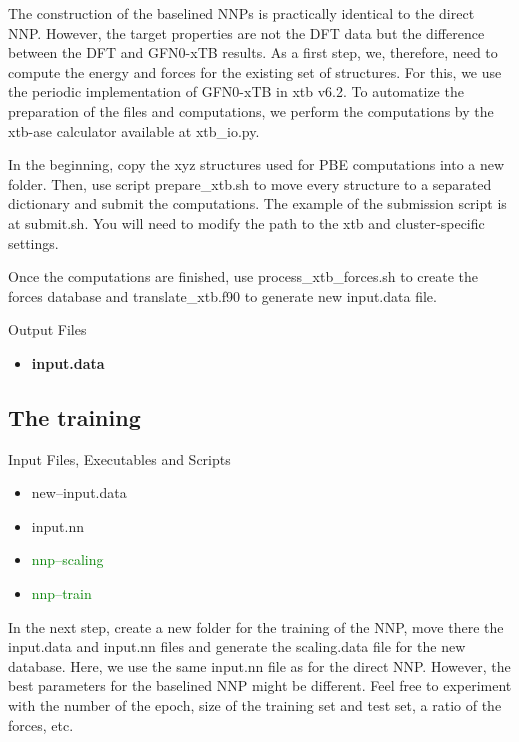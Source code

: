 \documentclass[12pt]{article}
\begin{document}
The construction of the baselined NNPs is practically identical to the direct NNP. However, the target properties are not the DFT data but the difference between the DFT and GFN0-xTB results. As a first step, we, therefore, need to compute the energy and forces for the existing set of structures. For this, we use the periodic implementation of GFN0-xTB in xtb v6.2. To automatize the preparation of the files and computations, we perform the computations by the xtb-ase calculator available at xtb\_io.py. 

In the beginning, copy the xyz structures used for PBE computations into a new folder. Then, use script prepare\_xtb.sh to move every structure to a separated dictionary and submit the computations. The example of the submission script is at submit.sh. You will need to modify the path to the xtb and cluster-specific settings.

Once the computations are finished, use process\_xtb\_forces.sh to create the forces database and translate\_xtb.f90 to generate new input.data file.

\begin{mybox3}{Output Files}
\begin{itemize}
    \item \textbf{input.data}
\end{itemize}
\end{mybox3}
%
\subsection{The training}
\begin{mybox2}{{Input Files, Executables and Scripts}}
\begin{minipage}[c]{0.5\linewidth}
\end{minipage}
\begin{minipage}[c]{0.5\linewidth}
\begin{itemize}
    \item new--input.data
    \item input.nn
    \item \textcolor{green}{nnp--scaling}
    \item \textcolor{green}{nnp--train}
\end{itemize}
\end{minipage}
\end{mybox2}

In the next step, create a new folder for the training of the NNP, move there the input.data and input.nn files and generate the scaling.data file for the new database. Here, we use the same input.nn file as for the direct NNP. However, the best parameters for the baselined NNP might be different. Feel free to experiment with the number of the epoch, size of the training set and test set, a ratio of the forces, etc.  
\end{document}
